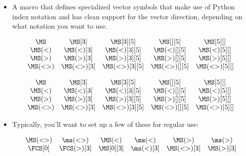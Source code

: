 \documentclass{article}
\begin{document}
\begin{itemize}
\item A macro that defines specialized vector symbols that make use of Python index notation
and has clean support for the vector direction, depending on what notation you want to use.
\begin{LTXexample}[pos=b]
\[\begin{matrix}
\MS     & \MS[3]     & \MS[3][5]     & \MS[][5]     & \MS[5][]     \\
\MS(<)  & \MS(<)[3]  & \MS(<)[3][5]  & \MS(<)[][5]  & \MS(<)[5][]  \\
\MS(>)  & \MS(>)[3]  & \MS(>)[3][5]  & \MS(>)[][5]  & \MS(>)[5][]  \\
\MS(<>) & \MS(<>)[3] & \MS(<>)[3][5] & \MS(<>)[][5] & \MS(<>)[5][] \\
\end{matrix}\]

\[\begin{matrix}
\MS     & \MS[3]     & \MS[3][5]     & \MS[][5]     & \MS[5][]     \\
\MS(<)  & \MS(<)[3]  & \MS(<)[3][5]  & \MS(<)[][5]  & \MS(<)[5][]  \\
\MS(>)  & \MS(>)[3]  & \MS(>)[3][5]  & \MS(>)[][5]  & \MS(>)[5][]  \\
\MS(<>) & \MS(<>)[3] & \MS(<>)[3][5] & \MS(<>)[][5] & \MS(<>)[5][] \\
\end{matrix}\]
\end{LTXexample}

\item Typically, you'll want to set up a few of these for regular use:
\begin{LTXexample}[pos=b]

\newcommand{\BiInfinity}{\MS(<>)}
\newcommand{\biinfinity}{\ms(<>)}
\newcommand{\Past}{\MS(<)}
\newcommand{\past}{\ms(<)}
\newcommand{\Future}{\MS(>)}
\newcommand{\future}{\ms(>)}

\begin{displaymath}
\begin{matrix}
  \BiInfinity & \biinfinity & \Past & \past & \Future & \future \\
  \FCS[0] & \FCS(>)[3] & \MS[0][3] & \past[3] & \MS(<>)[3] & \Future[3]
\end{matrix}
\end{displaymath}
\end{LTXexample}


\end{itemize}
\end{document}
